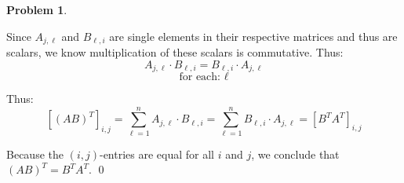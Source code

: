 \documentclass[12pt, oneside]{amsart}
\theoremstyle{definition}
\newtheorem{prob}{Problem}
\begin{document}
\begin{prob}
\begin{enumerate}
\begin{solution}
    Since $A_{j,\ell}$ and $B_{\ell,i}$ are single elements in their respective matrices and thus are scalars, we know multiplication of these scalars is commutative. Thus:
    \[
      A_{j,\ell} \cdot B_{\ell,i} = B_{\ell,i} \cdot A_{j,\ell}
    \]
    \[
    \text{for each: } \ell
    \]
    
    Thus:
    \[
    [(AB)^T]_{i,j} = \sum_{\ell=1}^{n} A_{j,\ell} \cdot B_{\ell,i} = \sum_{\ell=1}^{n} B_{\ell,i} \cdot A_{j,\ell} = [B^T A^T]_{i,j}
    \]
    
    
    Because the $(i,j)$-entries are equal for all $i$ and $j$, we conclude that $(AB)^T = B^T A^T$. \qed
    \end{solution}

    \end{enumerate}

\end{prob}
\end{document}
